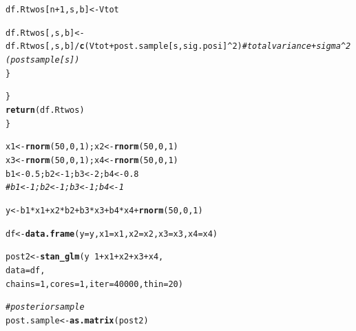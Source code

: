 \documentclass[11pt,a4paper,twoside]{book}\usepackage[]{graphicx}\usepackage[]{color}
\makeatletter
\newcommand{\hlnum}[1]{\textcolor[rgb]{0.686,0.059,0.569}{#1}}%
\newcommand{\hlcom}[1]{\textcolor[rgb]{0.678,0.584,0.686}{\textit{#1}}}%
\newcommand{\hlopt}[1]{\textcolor[rgb]{0,0,0}{#1}}%
\newcommand{\hlstd}[1]{\textcolor[rgb]{0.345,0.345,0.345}{#1}}%
\newcommand{\hlkwb}[1]{\textcolor[rgb]{0.69,0.353,0.396}{#1}}%
\newcommand{\hlkwc}[1]{\textcolor[rgb]{0.333,0.667,0.333}{#1}}%
\newcommand{\hlkwd}[1]{\textcolor[rgb]{0.737,0.353,0.396}{\textbf{#1}}}%
\newenvironment{kframe}{%
 \def\at@end@of@kframe{}%
 \ifinner\ifhmode%
  \def\at@end@of@kframe{\end{minipage}}%
  \begin{minipage}{\columnwidth}%
 \fi\fi%
 \def\FrameCommand##1{\hskip\@totalleftmargin \hskip-\fboxsep
 \colorbox{shadecolor}{##1}\hskip-\fboxsep
     \hskip-\linewidth \hskip-\@totalleftmargin \hskip\columnwidth}%
 \MakeFramed {\advance\hsize-\width
   \@totalleftmargin\z@ \linewidth\hsize
   \@setminipage}}%
 {\par\unskip\endMakeFramed%
 \at@end@of@kframe}
\newenvironment{knitrout}{}{} %
\makeatother
\begin{document}
\begin{knitrout}
\begin{kframe}
\begin{alltt}
                        \hlstd{df.Rtwos[n}\hlopt{+}\hlnum{1}\hlstd{,s,b]} \hlkwb{<-} \hlstd{Vtot}

                        \hlstd{df.Rtwos[,s,b]} \hlkwb{<-} \hlstd{df.Rtwos[,s,b]}\hlopt{/}\hlkwd{c}\hlstd{(Vtot}\hlopt{+}\hlstd{post.sample[s,sig.posi]}\hlopt{^}\hlnum{2}\hlstd{)} \hlcom{#total variance + sigma^2 (post sample[s])}
                \hlstd{\}}

        \hlstd{\}}
        \hlkwd{return}\hlstd{(df.Rtwos)}
\hlstd{\}}


\hlstd{x1} \hlkwb{<-} \hlkwd{rnorm}\hlstd{(}\hlnum{50}\hlstd{,} \hlnum{0}\hlstd{,} \hlnum{1}\hlstd{); x2} \hlkwb{<-} \hlkwd{rnorm}\hlstd{(}\hlnum{50}\hlstd{,} \hlnum{0}\hlstd{,} \hlnum{1}\hlstd{)}
\hlstd{x3} \hlkwb{<-} \hlkwd{rnorm}\hlstd{(}\hlnum{50}\hlstd{,} \hlnum{0}\hlstd{,} \hlnum{1}\hlstd{); x4} \hlkwb{<-} \hlkwd{rnorm}\hlstd{(}\hlnum{50}\hlstd{,} \hlnum{0}\hlstd{,} \hlnum{1}\hlstd{)}
\hlstd{b1} \hlkwb{<-} \hlnum{0.5}\hlstd{; b2} \hlkwb{<-} \hlnum{1}\hlstd{; b3} \hlkwb{<-} \hlnum{2}\hlstd{; b4} \hlkwb{<-} \hlnum{0.8}
\hlcom{#b1 <- 1; b2 <- 1; b3 <- 1; b4 <- 1}

\hlstd{y} \hlkwb{<-} \hlstd{b1}\hlopt{*}\hlstd{x1} \hlopt{+} \hlstd{x2}\hlopt{*}\hlstd{b2} \hlopt{+} \hlstd{b3}\hlopt{*}\hlstd{x3} \hlopt{+} \hlstd{b4}\hlopt{*}\hlstd{x4} \hlopt{+} \hlkwd{rnorm}\hlstd{(}\hlnum{50}\hlstd{,} \hlnum{0}\hlstd{,} \hlnum{1}\hlstd{)}

\hlstd{df} \hlkwb{<-} \hlkwd{data.frame}\hlstd{(}\hlkwc{y} \hlstd{= y,} \hlkwc{x1} \hlstd{= x1,} \hlkwc{x2} \hlstd{= x2,} \hlkwc{x3} \hlstd{= x3,} \hlkwc{x4} \hlstd{= x4)}

\hlstd{post2} \hlkwb{<-} \hlkwd{stan_glm}\hlstd{(y} \hlopt{~} \hlnum{1} \hlopt{+} \hlstd{x1} \hlopt{+} \hlstd{x2} \hlopt{+} \hlstd{x3} \hlopt{+} \hlstd{x4,}
                  \hlkwc{data} \hlstd{= df,}
                  \hlkwc{chains} \hlstd{=} \hlnum{1}\hlstd{,} \hlkwc{cores} \hlstd{=}\hlnum{1}\hlstd{,} \hlkwc{iter}\hlstd{=}\hlnum{40000}\hlstd{,} \hlkwc{thin}\hlstd{=}\hlnum{20}\hlstd{)}



\hlcom{#posterior sample}
\hlstd{post.sample} \hlkwb{<-} \hlkwd{as.matrix}\hlstd{(post2)}


\end{alltt}
\end{kframe}
\end{knitrout}
\end{document}
